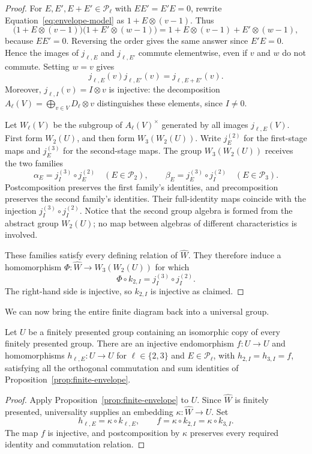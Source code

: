 \begin{proof}
For $E,E',E+E'\in\mathcal P_\ell$ with $EE'=E'E=0$, rewrite
Equation~\eqref{eq:envelope-model} as $1+E\otimes(v-1)$.  Thus
\[
 \bigl(1+E\otimes(v-1)\bigr)
 \bigl(1+E'\otimes(w-1)\bigr)
 =1+E\otimes(v-1)+E'\otimes(w-1),
\]
because $EE'=0$.  Reversing the order gives the same answer since
$E'E=0$.  Hence the images of $j_{\ell,E}$ and $j_{\ell,E'}$
commute elementwise, even if $v$ and $w$ do not commute.  Setting
$w=v$ gives
\[
 j_{\ell,E}(v)j_{\ell,E'}(v)=j_{\ell,E+E'}(v).
\]
Moreover, $j_{\ell,I}(v)=I\otimes v$ is injective: the decomposition
$A_\ell(V)=\bigoplus_{v\in V}D_\ell\otimes v$ distinguishes these
elements, since $I\ne0$.

Let $W_\ell(V)$ be the subgroup of $A_\ell(V)^\times$ generated by
all images $j_{\ell,E}(V)$.  First form $W_2(U)$, and then form
$W_3(W_2(U))$.  Write $j_E^{(2)}$ for the first-stage maps and
$j_E^{(3)}$ for the second-stage maps.  The group $W_3(W_2(U))$
receives the two families
\[
 \alpha_E=j_I^{(3)}\circ j_E^{(2)}\quad(E\in\mathcal P_2),
 \qquad
 \beta_E=j_E^{(3)}\circ j_I^{(2)}\quad(E\in\mathcal P_3).
\]
Postcomposition preserves the first family's identities, and
precomposition preserves the second family's identities.  Their
full-identity maps coincide with the injection
$j_I^{(3)}\circ j_I^{(2)}$.  Notice that the second group algebra is
formed from the abstract group $W_2(U)$; no map between algebras of
different characteristics is involved.

These families satisfy every defining relation of $\widehat W$.
They therefore induce a homomorphism
$\Phi:\widehat W\to W_3(W_2(U))$ for which
\[
 \Phi\circ k_{2,I}=j_I^{(3)}\circ j_I^{(2)}.
\]
The right-hand side is injective, so $k_{2,I}$ is injective as claimed.
\end{proof}

We can now bring the entire finite diagram back into a universal group.

\begin{corollary}\label{prop:self-map}
Let $U$ be a finitely presented group containing an isomorphic copy of
every finitely presented group.  There are an injective endomorphism
$f:U\to U$ and homomorphisms
$h_{\ell,E}:U\to U$ for $\ell\in\{2,3\}$ and
$E\in\mathcal P_\ell$, with $h_{2,I}=h_{3,I}=f$, satisfying all the
orthogonal commutation and sum identities of
Proposition~\ref{prop:finite-envelope}.
\end{corollary}

\begin{proof}
Apply Proposition~\ref{prop:finite-envelope} to $U$.  Since
$\widehat W$ is finitely presented, universality supplies an embedding
$\kappa:\widehat W\to U$.  Set
\[
 h_{\ell,E}=\kappa\circ k_{\ell,E},
 \qquad f=\kappa\circ k_{2,I}=\kappa\circ k_{3,I}.
\]
The map $f$ is injective, and postcomposition by $\kappa$ preserves
every required identity and commutation relation.
\end{proof}

